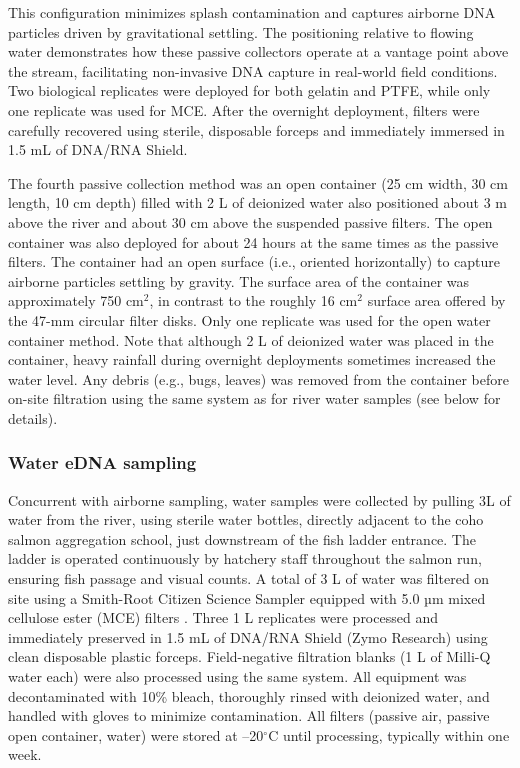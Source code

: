 \documentclass{article}
\begin{document}
This configuration minimizes splash contamination and captures airborne DNA particles driven by gravitational settling. The positioning relative to flowing water demonstrates how these passive collectors operate at a vantage point above the stream, facilitating non-invasive DNA capture in real-world field conditions. Two biological replicates were deployed for both gelatin and PTFE, while only one replicate was used for MCE. After the overnight deployment, filters were carefully recovered using sterile, disposable forceps and immediately immersed in 1.5 mL of DNA/RNA Shield. 

The fourth passive collection method was an open container (25 cm width, 30 cm length, 10 cm depth) filled with 2 L of deionized water \cite{klepke2022} also positioned about 3 m above the river and about 30 cm above the suspended passive filters. The open container was also deployed for about 24 hours at the same times as the passive filters. The container had an open surface (i.e., oriented horizontally) to capture airborne particles settling by gravity. The surface area of the container was approximately 750 cm$^2$, in contrast to the roughly 16 cm$^2$ surface area offered by the 47-mm circular filter disks. Only one replicate was used for the open water container method. Note that although 2 L of deionized water was placed in the container, heavy rainfall during overnight deployments sometimes increased the water level. Any debris (e.g., bugs, leaves) was removed from the container before on-site filtration using the same system as for river water samples (see below for details).

\subsubsection{Water eDNA sampling}
Concurrent with airborne sampling, water samples were collected by pulling 3L of water from the river, using sterile water bottles, directly adjacent to the coho salmon aggregation school, just downstream of the fish ladder entrance. The ladder is operated continuously by hatchery staff throughout the salmon run, ensuring fish passage and visual counts. A total of 3 L of water was filtered on site using a Smith-Root Citizen Science Sampler equipped with 5.0 µm mixed cellulose ester (MCE) filters \cite{allan2023}. Three 1 L replicates were processed and immediately preserved in 1.5 mL of DNA/RNA Shield (Zymo Research) using clean disposable plastic forceps. Field-negative filtration blanks (1 L of Milli-Q water each) were also processed using the same system. All equipment was decontaminated with 10\% bleach, thoroughly rinsed with deionized water, and handled with gloves to minimize contamination. All filters (passive air, passive open container, water) were stored at –20$^\circ$C until processing, typically within one week.
\end{document}
